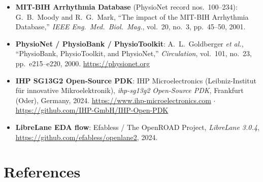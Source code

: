 \documentclass[11pt]{article}
\begin{document}
\begin{itemize}[noitemsep]
  \item \textbf{MIT-BIH Arrhythmia Database} (PhysioNet record nos.\ 100--234):
        G.\ B.\ Moody and R.\ G.\ Mark, ``The impact of the MIT-BIH Arrhythmia
        Database,'' \emph{IEEE Eng.\ Med.\ Biol.\ Mag.}, vol.\ 20, no.\ 3,
        pp.\ 45--50, 2001.
  \item \textbf{PhysioNet / PhysioBank / PhysioToolkit}:
        A.\ L.\ Goldberger \emph{et al.}, ``PhysioBank, PhysioToolkit, and
        PhysioNet,'' \emph{Circulation}, vol.\ 101, no.\ 23,
        pp.\ e215--e220, 2000.  \url{https://physionet.org}
  \item \textbf{IHP SG13G2 Open-Source PDK}:
        IHP Microelectronics (Leibniz-Institut für innovative Mikroelektronik),
        \emph{ihp-sg13g2 Open-Source PDK}, Frankfurt (Oder), Germany, 2024.
        \url{https://www.ihp-microelectronics.com} $\cdot$
        \url{https://github.com/IHP-GmbH/IHP-Open-PDK}
  \item \textbf{LibreLane EDA flow}:
        Efabless / The OpenROAD Project, \emph{LibreLane 3.0.4},
        \url{https://github.com/efabless/openlane2}, 2024.
\end{itemize}

\section{References}
\end{document}
